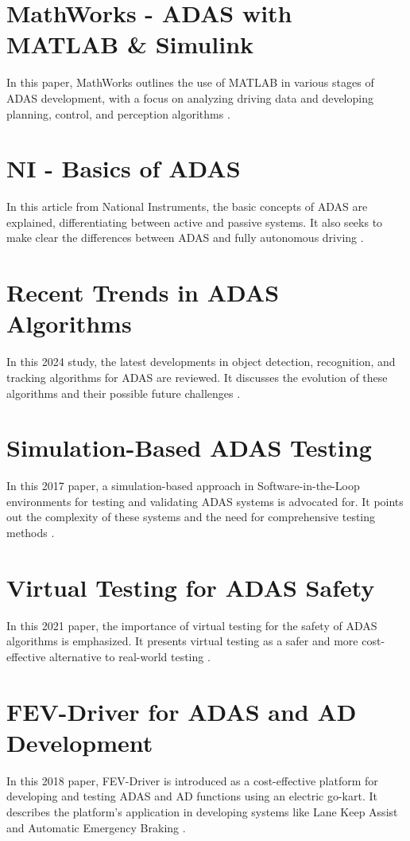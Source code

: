 \documentclass[12pt]{report}
\begin{document}
\section{MathWorks - ADAS with MATLAB \& Simulink}
In this paper, MathWorks outlines the use of MATLAB in various stages of ADAS development, with a focus on analyzing driving data and developing planning, control, and perception algorithms \citep{mathworks2024}.

\section{NI - Basics of ADAS}
In this article from National Instruments, the basic concepts of ADAS are explained, differentiating between active and passive systems. It also seeks to make clear the differences between ADAS and fully autonomous driving \citep{niADAS2024}.

\section{Recent Trends in ADAS Algorithms}
In this 2024 study, the latest developments in object detection, recognition, and tracking algorithms for ADAS are reviewed. It discusses the evolution of these algorithms and their possible future challenges \citep{adasTrends2024}.

\section{Simulation-Based ADAS Testing}
In this 2017 paper, a simulation-based approach in Software-in-the-Loop environments for testing and validating ADAS systems is advocated for. It points out the complexity of these systems and the need for comprehensive testing methods \citep{simulationTest2024}.

\section{Virtual Testing for ADAS Safety}
In this 2021 paper, the importance of virtual testing for the safety of ADAS algorithms is emphasized. It presents virtual testing as a safer and more cost-effective alternative to real-world testing \citep{virtualTesting2024}.

\section{FEV-Driver for ADAS and AD Development}
In this 2018 paper, FEV-Driver is introduced as a cost-effective platform for developing and testing ADAS and AD functions using an electric go-kart. It describes the platform's application in developing systems like Lane Keep Assist and Automatic Emergency Braking \citep{fevDriver2024}.
\end{document}
